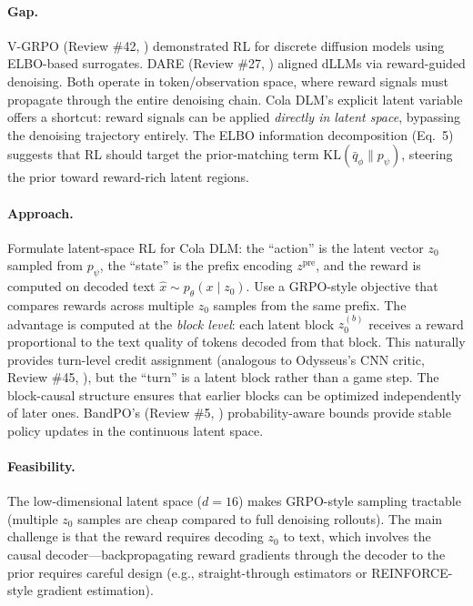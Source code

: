 \documentclass[11pt]{article}
\begin{document}
\paragraph{Gap.}
V-GRPO (Review \#42, \cite{vgrpo}) demonstrated RL for discrete diffusion models using ELBO-based surrogates. DARE (Review \#27, \cite{dare}) aligned dLLMs via reward-guided denoising. Both operate in token/observation space, where reward signals must propagate through the entire denoising chain. Cola DLM's explicit latent variable offers a shortcut: reward signals can be applied \emph{directly in latent space}, bypassing the denoising trajectory entirely. The ELBO information decomposition (Eq.\ 5) suggests that RL should target the prior-matching term $\mathrm{KL}(\bar{q}_\phi \| p_\psi)$, steering the prior toward reward-rich latent regions.

\paragraph{Approach.}
Formulate latent-space RL for Cola DLM: the ``action'' is the latent vector $z_0$ sampled from $p_\psi$, the ``state'' is the prefix encoding $z^{\mathrm{pre}}$, and the reward is computed on decoded text $\hat{x} \sim p_\theta(x \mid z_0)$. Use a GRPO-style objective that compares rewards across multiple $z_0$ samples from the same prefix. The advantage is computed at the \emph{block level}: each latent block $z_0^{(b)}$ receives a reward proportional to the text quality of tokens decoded from that block. This naturally provides turn-level credit assignment (analogous to Odysseus's CNN critic, Review \#45, \cite{odysseus}), but the ``turn'' is a latent block rather than a game step. The block-causal structure ensures that earlier blocks can be optimized independently of later ones. BandPO's (Review \#5, \cite{bandpo}) probability-aware bounds provide stable policy updates in the continuous latent space.

\paragraph{Feasibility.}
The low-dimensional latent space ($d = 16$) makes GRPO-style sampling tractable (multiple $z_0$ samples are cheap compared to full denoising rollouts). The main challenge is that the reward requires decoding $z_0$ to text, which involves the causal decoder---backpropagating reward gradients through the decoder to the prior requires careful design (e.g., straight-through estimators or REINFORCE-style gradient estimation).
\end{document}
